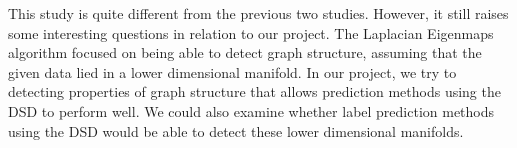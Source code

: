 This study is quite different from the previous two studies. However, it still raises some interesting questions in relation to our project.
The Laplacian Eigenmaps algorithm focused on being able to detect graph structure, assuming that
the given data lied in a lower dimensional manifold. In our project, we try 
to detecting properties of graph structure that allows prediction methods
using the DSD to perform well. We could also examine whether label prediction
methods using the DSD would be able to detect these lower dimensional manifolds.

